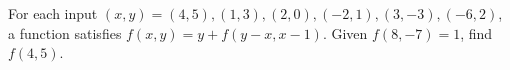 For each input $(x,y)=(4,5),(1,3),(2,0),(-2,1),(3,-3),(-6,2)$, a function satisfies $f(x,y)=y+f(y-x,x-1)$. Given $f(8,-7)=1$, find $f(4,5)$.
